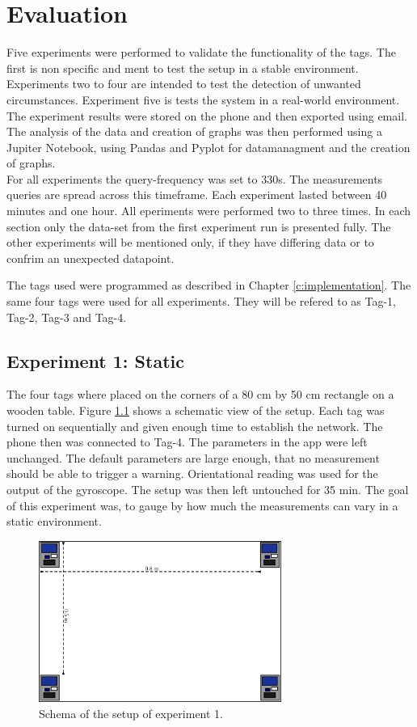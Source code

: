 \chapter{Evaluation}
\label{chap:evaluation}

Five experiments were performed to validate the functionality of the tags.
The first is non specific and ment to test the setup in a stable environment.
Experiments two to four are intended to test the detection of unwanted circumstances.
Experiment five is tests the system in a real-world environment.
The experiment results were stored on the phone and then exported using email.
The analysis of the data and creation of graphs was then performed using a Jupiter Notebook, using Pandas and Pyplot for datamanagment and the creation of graphs.\\
For all experiments the query-frequency was set to 330s.
The measurements queries are spread across this timeframe.
Each experiment lasted between 40 minutes and one hour.
All eperiments were performed two to three times.
In each section only the data-set from the first experiment run is presented fully.
The other experiments will be mentioned only, if they have differing data or to confrim an unexpected datapoint.

The tags used were programmed as described in Chapter \ref{c:implementation}.
The same four tags were used for all experiments.
They will be refered to as Tag-1, Tag-2, Tag-3 and Tag-4.





\section{Experiment 1: Static}
\label{ss:exp_1}
The four tags where placed on the corners of a 80 cm by 50 cm rectangle on a wooden table.
Figure \ref{f:exp1_schematic} shows a schematic view of the setup.
Each tag was turned on sequentially and given enough time to establish the network.
The phone then was connected to Tag-4.
The parameters in the app were left unchanged.
The default parameters are large enough, that no measurement should be able to trigger a warning.
Orientational reading was used for the output of the gyroscope.
The setup was then left untouched for 35 min.
The goal of this experiment was, to gauge by how much the measurements can vary in a static environment.

\begin{figure}[ht!]
	\centering
	\includegraphics[width=300px]{graphics/schematics/experiment_1.png}
	\caption{Schema of the setup of experiment 1.}
	\label{f:exp1_schematic}
\end{figure}


